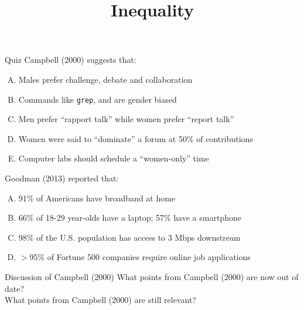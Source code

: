 \documentclass{beamer}
\title{Inequality}
\date{}
\begin{document}
\begin{frame}
\titlepage
\end{frame}

\begin{frame}{Quiz}
Campbell (2000) suggests that:
\begin{enumerate}[(A)]
\item<1> Males prefer challenge, debate and collaboration %
\item<1> Commands like \texttt{grep},  and  are gender biased %
\item<1> Men prefer ``rapport talk'' while women prefer ``report talk'' %
\item<1> Women were said to ``dominate'' a forum at 50\% of contributions %
\item<1-2> Computer labs should schedule a ``women-only'' time
\end{enumerate}
\bigskip
Goodman (2013) reported that:
\begin{enumerate}[(A)]
\item<1> 91\% of Americans have broadband at home %
\item<1> 66\% of 18-29 year-olds have a laptop; 57\% have a smartphone %
\item<1-2> 98\% of the U.S. population has access to 3 Mbps downstream
\item<1> $>$95\% of Fortune 500 companies require online job applications %
\end{enumerate}
\end{frame}

\begin{frame}{Discussion of Campbell (2000)}
What points from Campbell (2000) are now out of date?\\[5em]
What points from Campbell (2000) are still relevant?
\end{frame}
\end{document}
